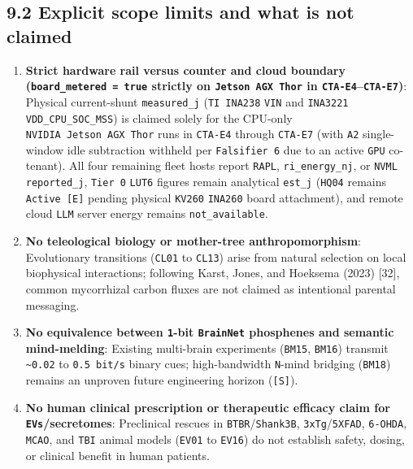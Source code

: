 \documentclass[10pt,letterpaper]{article}
\providecommand{\tightlist}{\setlength{\itemsep}{1pt}\setlength{\parskip}{0pt}}
\begin{document}
\subsection{9.2 Explicit scope limits and what is not
claimed}\label{explicit-scope-limits-and-what-is-not-claimed}

\begin{enumerate}
\def\labelenumi{\arabic{enumi}.}
\tightlist
\item
  \textbf{Strict hardware rail versus counter and cloud boundary
  (\texttt{board\_\allowbreak{}metered\ =\ true} strictly on
  \texttt{Jetson\ AGX\ Thor} in \texttt{CTA-E4}--\texttt{CTA-E7})}:
  Physical current-shunt \texttt{measured\_\allowbreak{}j} (\texttt{TI\ INA238}
  \texttt{VIN} and \texttt{INA3221} \texttt{VDD\_\allowbreak{}CPU\_\allowbreak{}SOC\_\allowbreak{}MSS}) is
  claimed solely for the CPU-only \texttt{NVIDIA\ Jetson\ AGX\ Thor}
  runs in \texttt{CTA-E4} through \texttt{CTA-E7} (with \texttt{A2}
  single-window idle subtraction withheld per \texttt{Falsifier\ 6} due
  to an active \texttt{GPU} co-tenant). All four remaining fleet hosts
  report \texttt{RAPL}, \texttt{ri\_\allowbreak{}energy\_\allowbreak{}nj}, or \texttt{NVML}
  \texttt{reported\_\allowbreak{}j}, \texttt{Tier\ 0} \texttt{LUT6} figures remain
  analytical \texttt{est\_j} (\texttt{HQ04} remains
  \texttt{Active\ {[}E{]}} pending physical \texttt{KV260}
  \texttt{INA260} board attachment), and remote cloud \texttt{LLM}
  server energy remains \texttt{not\_\allowbreak{}available}.
\item
  \textbf{No teleological biology or mother-tree anthropomorphism}:
  Evolutionary transitions (\texttt{CL01} to \texttt{CL13}) arise from
  natural selection on local biophysical interactions; following Karst,
  Jones, and Hoeksema (2023) {[}32{]}, common mycorrhizal carbon fluxes
  are not claimed as intentional parental messaging.
\item
  \textbf{No equivalence between \texttt{1}-bit \texttt{BrainNet}
  phosphenes and semantic mind-melding}: Existing multi-brain
  experiments (\texttt{BM15}, \texttt{BM16}) transmit
  \texttt{\textasciitilde{}0.02} to \texttt{0.\allowbreak{}5\ bit/\allowbreak{}s} binary cues;
  high-bandwidth \texttt{N}-mind bridging (\texttt{BM18}) remains an
  unproven future engineering horizon (\texttt{{[}S{]}}).
\item
  \textbf{No human clinical prescription or therapeutic efficacy claim
  for \texttt{EVs}/\allowbreak{}secretomes}: Preclinical rescues in
  \texttt{BTBR}/\allowbreak{}\texttt{Shank3B}, \texttt{3xTg}/\allowbreak{}\texttt{5XFAD},
  \texttt{6-OHDA}, \texttt{MCAO}, and \texttt{TBI} animal models
  (\texttt{EV01} to \texttt{EV16}) do not establish safety, dosing, or
  clinical benefit in human patients.
\end{enumerate}
\end{document}
